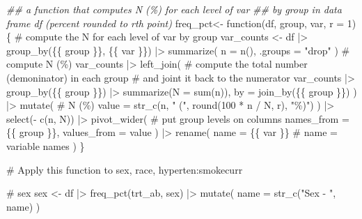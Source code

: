 \documentclass[
  letterpaper,
  DIV=11,
  numbers=noendperiod]{scrreprt}
\newenvironment{Shaded}{\begin{snugshade}}{\end{snugshade}}
\newcommand{\AttributeTok}[1]{\textcolor[rgb]{0.40,0.45,0.13}{#1}}
\newcommand{\CommentTok}[1]{\textcolor[rgb]{0.37,0.37,0.37}{#1}}
\newcommand{\ControlFlowTok}[1]{\textcolor[rgb]{0.00,0.23,0.31}{#1}}
\newcommand{\DecValTok}[1]{\textcolor[rgb]{0.68,0.00,0.00}{#1}}
\newcommand{\DocumentationTok}[1]{\textcolor[rgb]{0.37,0.37,0.37}{\textit{#1}}}
\newcommand{\FunctionTok}[1]{\textcolor[rgb]{0.28,0.35,0.67}{#1}}
\newcommand{\NormalTok}[1]{\textcolor[rgb]{0.00,0.23,0.31}{#1}}
\newcommand{\OtherTok}[1]{\textcolor[rgb]{0.00,0.23,0.31}{#1}}
\newcommand{\SpecialCharTok}[1]{\textcolor[rgb]{0.37,0.37,0.37}{#1}}
\newcommand{\StringTok}[1]{\textcolor[rgb]{0.13,0.47,0.30}{#1}}
\begin{document}
\begin{Shaded}
\begin{Highlighting}[]
\DocumentationTok{\#\# a function that computes N (\%) for each level of var}
\DocumentationTok{\#\# by group in data frame df (percent rounded to rth point)}
\NormalTok{freq\_pct}\OtherTok{\textless{}{-}} \ControlFlowTok{function}\NormalTok{(df, group, var, }\AttributeTok{r =} \DecValTok{1}\NormalTok{)\{}
  \CommentTok{\# compute the N for each level of var by group}
\NormalTok{  var\_counts }\OtherTok{\textless{}{-}}\NormalTok{ df }\SpecialCharTok{|\textgreater{}} 
    \FunctionTok{group\_by}\NormalTok{(\{\{ group \}\}, \{\{ var \}\}) }\SpecialCharTok{|\textgreater{}} 
    \FunctionTok{summarize}\NormalTok{(}
      \AttributeTok{n =} \FunctionTok{n}\NormalTok{(),}
      \AttributeTok{.groups =} \StringTok{"drop"}
\NormalTok{    ) }
  \CommentTok{\# compute N (\%)}
\NormalTok{  var\_counts }\SpecialCharTok{|\textgreater{}} 
    \FunctionTok{left\_join}\NormalTok{( }\CommentTok{\# compute the total number (demoninator) in each group}
      \CommentTok{\# and joint it back to the numerator}
\NormalTok{      var\_counts }\SpecialCharTok{|\textgreater{}} \FunctionTok{group\_by}\NormalTok{(\{\{ group \}\}) }\SpecialCharTok{|\textgreater{}} \FunctionTok{summarize}\NormalTok{(}\AttributeTok{N =} \FunctionTok{sum}\NormalTok{(n)),}
      \AttributeTok{by =} \FunctionTok{join\_by}\NormalTok{(\{\{ group \}\})}
\NormalTok{    ) }\SpecialCharTok{|\textgreater{}} 
    \FunctionTok{mutate}\NormalTok{( }\CommentTok{\# N (\%)}
      \AttributeTok{value =} \FunctionTok{str\_c}\NormalTok{(n, }\StringTok{" ("}\NormalTok{, }\FunctionTok{round}\NormalTok{(}\DecValTok{100} \SpecialCharTok{*}\NormalTok{ n }\SpecialCharTok{/}\NormalTok{ N, r), }\StringTok{"\%)"}\NormalTok{)}
\NormalTok{    ) }\SpecialCharTok{|\textgreater{}} 
    \FunctionTok{select}\NormalTok{(}\SpecialCharTok{{-}} \FunctionTok{c}\NormalTok{(n, N)) }\SpecialCharTok{|\textgreater{}} 
    \FunctionTok{pivot\_wider}\NormalTok{( }\CommentTok{\# put group levels on columns}
      \AttributeTok{names\_from =}\NormalTok{ \{\{ group \}\},}
      \AttributeTok{values\_from =}\NormalTok{ value}
\NormalTok{    ) }\SpecialCharTok{|\textgreater{}} 
    \FunctionTok{rename}\NormalTok{(}
      \AttributeTok{name =}\NormalTok{ \{\{ var \}\} }\CommentTok{\# name = variable names }
\NormalTok{    )}
\NormalTok{\}}

\CommentTok{\# Apply this function to sex, race, hyperten:smokecurr }
  
\CommentTok{\# sex}
\NormalTok{sex }\OtherTok{\textless{}{-}}\NormalTok{ df }\SpecialCharTok{|\textgreater{}}
  \FunctionTok{freq\_pct}\NormalTok{(trt\_ab, sex) }\SpecialCharTok{|\textgreater{}} 
  \FunctionTok{mutate}\NormalTok{(}
    \AttributeTok{name =} \FunctionTok{str\_c}\NormalTok{(}\StringTok{"Sex {-} "}\NormalTok{, name)}
\NormalTok{  )}


\end{Highlighting}
\end{Shaded}
\end{document}
